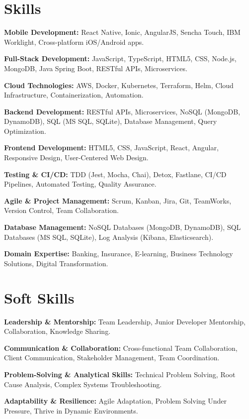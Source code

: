 \documentclass[10pt, letterpaper]{article}
\begin{document}
\section*{Skills}

\noindent \textbf{Mobile Development:} React Native, Ionic, AngularJS, Sencha Touch, IBM Worklight, Cross-platform iOS/Android apps.

\noindent \textbf{Full-Stack Development:} JavaScript, TypeScript, HTML5, CSS, Node.js, MongoDB, Java Spring Boot, RESTful APIs, Microservices.

\noindent \textbf{Cloud Technologies:} AWS, Docker, Kubernetes, Terraform, Helm, Cloud Infrastructure, Containerization, Automation.

\noindent \textbf{Backend Development:} RESTful APIs, Microservices, NoSQL (MongoDB, DynamoDB), SQL (MS SQL, SQLite), Database Management, Query Optimization.

\noindent \textbf{Frontend Development:} HTML5, CSS, JavaScript, React, Angular, Responsive Design, User-Centered Web Design.

\noindent \textbf{Testing \& CI/CD:} TDD (Jest, Mocha, Chai), Detox, Fastlane, CI/CD Pipelines, Automated Testing, Quality Assurance.

\noindent \textbf{Agile \& Project Management:} Scrum, Kanban, Jira, Git, TeamWorks, Version Control, Team Collaboration.

\noindent \textbf{Database Management:} NoSQL Databases (MongoDB, DynamoDB), SQL Databases (MS SQL, SQLite), Log Analysis (Kibana, Elasticsearch).

\noindent \textbf{Domain Expertise:} Banking, Insurance, E-learning, Business Technology Solutions, Digital Transformation.

\section*{Soft Skills}

\noindent \textbf{Leadership \& Mentorship:} Team Leadership, Junior Developer Mentorship, Collaboration, Knowledge Sharing.

\noindent \textbf{Communication \& Collaboration:} Cross-functional Team Collaboration, Client Communication, Stakeholder Management, Team Coordination.

\noindent \textbf{Problem-Solving \& Analytical Skills:} Technical Problem Solving, Root Cause Analysis, Complex Systems Troubleshooting.

\noindent \textbf{Adaptability \& Resilience:} Agile Adaptation, Problem Solving Under Pressure, Thrive in Dynamic Environments.
\end{document}
